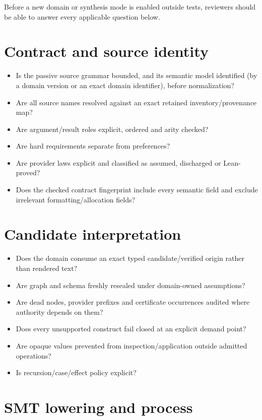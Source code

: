\documentclass[11pt,oneside]{report}
\begin{document}
Before a new domain or synthesis mode is enabled outside tests, reviewers should be able to answer every applicable question below.

\section{Contract and source identity}

\begin{itemize}[leftmargin=2em]
\item Is the passive source grammar bounded, and its semantic model identified (by a domain version or an exact domain identifier), before normalization?
\item Are all source names resolved against an exact retained inventory/provenance map?
\item Are argument/result roles explicit, ordered and arity checked?
\item Are hard requirements separate from preferences?
\item Are provider laws explicit and classified as assumed, discharged or Lean-proved?
\item Does the checked contract fingerprint include every semantic field and exclude irrelevant formatting/allocation fields?
\end{itemize}

\section{Candidate interpretation}

\begin{itemize}[leftmargin=2em]
\item Does the domain consume an exact typed candidate/verified origin rather than rendered text?
\item Are graph and schema freshly resealed under domain-owned assumptions?
\item Are dead nodes, provider prefixes and certificate occurrences audited where authority depends on them?
\item Does every unsupported construct fail closed at an explicit demand point?
\item Are opaque values prevented from inspection/application outside admitted operations?
\item Is recursion/case/effect policy explicit?
\end{itemize}

\section{SMT lowering and process}
\end{document}
